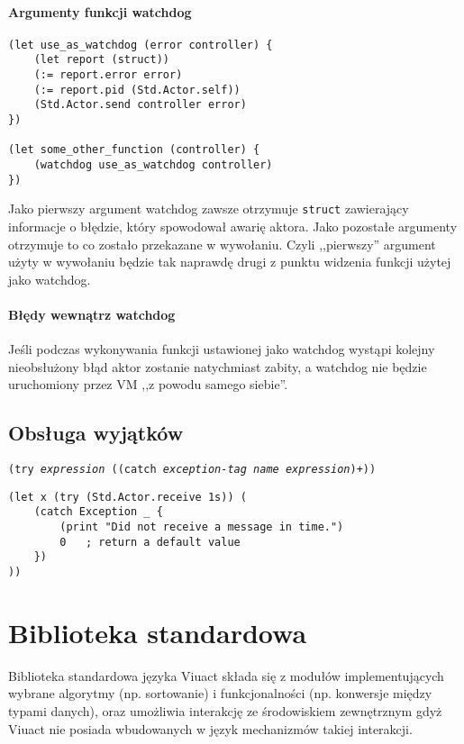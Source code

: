 \paragraph*{Argumenty funkcji watchdog}

\begin{lstlisting}
(let use_as_watchdog (error controller) {
    (let report (struct))
    (:= report.error error)
    (:= report.pid (Std.Actor.self))
    (Std.Actor.send controller error)
})

(let some_other_function (controller) {
    (watchdog use_as_watchdog controller)
})
\end{lstlisting}

Jako pierwszy argument watchdog zawsze otrzymuje \texttt{struct} zawierający informacje o błędzie, który
spowodował awarię aktora. Jako pozostałe argumenty otrzymuje to co zostało przekazane w wywołaniu.
Czyli ,,pierwszy'' argument użyty w wywołaniu będzie tak naprawdę drugi z punktu widzenia funkcji użytej jako
watchdog.

\paragraph*{Błędy wewnątrz watchdog}

Jeśli podczas wykonywania funkcji ustawionej jako watchdog wystąpi kolejny nieobsłużony błąd aktor zostanie
natychmiast zabity, a watchdog nie będzie uruchomiony przez VM ,,z powodu samego siebie''.

\subsection{Obsługa wyjątków}

\texttt{(try \emph{expression} ((catch \emph{exception-tag} \emph{name} \emph{expression})+))}

\begin{lstlisting}
(let x (try (Std.Actor.receive 1s)) (
    (catch Exception _ {
        (print "Did not receive a message in time.")
        0   ; return a default value
    })
))
\end{lstlisting}

\newpage
\section{Biblioteka standardowa}

Biblioteka standardowa języka Viuact składa się z modułów implementujących wybrane algorytmy (np. sortowanie)
i funkcjonalności (np. konwersje między typami danych), oraz umożliwia interakcję ze środowiskiem zewnętrznym
gdyż Viuact nie posiada wbudowanych w język mechanizmów takiej interakcji.

